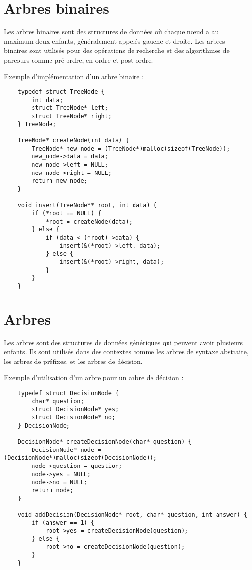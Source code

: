 \section{Arbres binaires}
Les arbres binaires sont des structures de données où chaque nœud a au maximum deux enfants, généralement appelés gauche et droite. Les arbres binaires sont utilisés pour des opérations de recherche et des algorithmes de parcours comme pré-ordre, en-ordre et post-ordre.

Exemple d'implémentation d'un arbre binaire :

\begin{lstlisting}
	typedef struct TreeNode {
		int data;
		struct TreeNode* left;
		struct TreeNode* right;
	} TreeNode;
	
	TreeNode* createNode(int data) {
		TreeNode* new_node = (TreeNode*)malloc(sizeof(TreeNode));
		new_node->data = data;
		new_node->left = NULL;
		new_node->right = NULL;
		return new_node;
	}
	
	void insert(TreeNode** root, int data) {
		if (*root == NULL) {
			*root = createNode(data);
		} else {
			if (data < (*root)->data) {
				insert(&(*root)->left, data);
			} else {
				insert(&(*root)->right, data);
			}
		}
	}
\end{lstlisting}

\section{Arbres}
Les arbres sont des structures de données génériques qui peuvent avoir plusieurs enfants. Ils sont utilisés dans des contextes comme les arbres de syntaxe abstraite, les arbres de préfixes, et les arbres de décision.

Exemple d'utilisation d'un arbre pour un arbre de décision :

\begin{lstlisting}
	typedef struct DecisionNode {
		char* question;
		struct DecisionNode* yes;
		struct DecisionNode* no;
	} DecisionNode;
	
	DecisionNode* createDecisionNode(char* question) {
		DecisionNode* node = (DecisionNode*)malloc(sizeof(DecisionNode));
		node->question = question;
		node->yes = NULL;
		node->no = NULL;
		return node;
	}
	
	void addDecision(DecisionNode* root, char* question, int answer) {
		if (answer == 1) {
			root->yes = createDecisionNode(question);
		} else {
			root->no = createDecisionNode(question);
		}
	}
\end{lstlisting}

